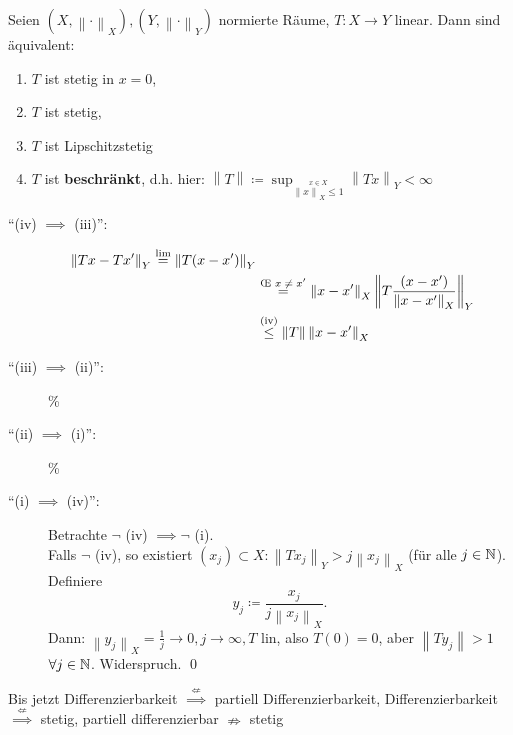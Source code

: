 \begin{lemma}
	Seien $ \left( X, \left\| \cdot  \right\| _X \right) , \left( Y, \left\| \cdot  \right\| _Y \right)  $ normierte Räume, $ T : X \to Y $ linear. Dann sind äquivalent:
	\begin{enumerate}[label=(\roman*)]
		\item $ T $ ist stetig in $ x = 0 $,
		\item $ T $ ist stetig,
		\item $ T $ ist Lipschitzstetig
		\item $ T $ ist \textbf{beschränkt}, d.h. hier: $ \left\| T \right\| \coloneqq \sup_{\overset{x \in X}{\left\| x \right\| _X \leq 1}} \left\| Tx \right\| _Y < \infty $
	\end{enumerate}
\end{lemma}
\begin{proof*}
	\begin{description}
		\item[``(iv) $ \implies  $ (iii)'':]
			\begin{align*}
				\left\| Tx - Tx^\prime  \right\| _{Y} \overset{\lim}{=} \left\| T (x - x^\prime ) \right\| _{Y} \\
				~ &\overset{\text{\OE{} $ x \neq x^\prime  $} }{=} \left\| x - x^\prime  \right\| _X \left\| T \frac{ ( x - x^\prime ) }{ \left\| x - x^\prime  \right\| _X }  \right\| _Y \\
				~ & \overset{\text{(iv)} }{\leq } \left\| T \right\| \left\| x - x' \right\| _X
			\end{align*}
		\item[``(iii) $ \implies  $ (ii)'':] \%
		\item[``(ii) $ \implies  $ (i)'':] \%
		\item[``(i) $ \implies  $ (iv)'':] Betrachte $ \neg $ (iv) $ \implies \neg $ (i).\\
			Falls $ \neg $ (iv), so existiert $ (x_j) \subset X : \left\| T x_j \right\| _Y > j \left\| x_j \right\| _X $ (für alle $ j \in \mathbb{N}  $).
			Definiere
			\[
				y_j \coloneqq \frac{ x_j }{ j \left\| x_j \right\| _X } .
			\]
			Dann: $ \left\| y_j \right\| _X = \frac{ 1 }{ j } \to 0, j \to \infty, T $ lin, also $ T(0) = 0 $, aber $ \left\| Ty_j \right\| > 1 $ $ \forall  j \in \mathbb{N}  $.
			Widerspruch. \qed
	\end{description}
\end{proof*}

Bis jetzt Differenzierbarkeit $ \overset{\nLeftarrow}{\implies }  $ partiell Differenzierbarkeit, Differenzierbarkeit $ \overset{\nLeftarrow }{\implies }  $ stetig, partiell differenzierbar $ \nRightarrow $ stetig

